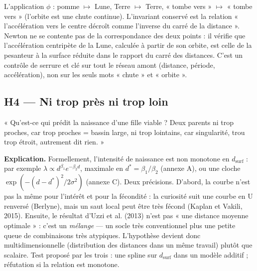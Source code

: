 \documentclass[a4paper,11pt]{article}
\begin{document}
\begin{exemple}
L'application $\phi$ : pomme $\mapsto$ Lune, Terre $\mapsto$ Terre, « tombe vers » $\mapsto$ « tombe vers » (l'orbite est une chute continue). L'invariant conservé est la relation « l'accélération vers le centre décroît comme l'inverse du carré de la distance ». Newton ne se contente pas de la correspondance des deux points : il vérifie que l'accélération centripète de la Lune, calculée à partir de son orbite, est celle de la pesanteur à la surface réduite dans le rapport du carré des distances. C'est un contrôle de serrure et clé sur tout le réseau amont (distance, période, accélération), non sur les seuls mots « chute » et « orbite ».
\end{exemple}

\subsection{H4 — Ni trop près ni trop loin}
\begin{enonce}
« Qu'est-ce qui prédit la naissance d'une fille viable ? Deux parents ni trop proches, car trop proches = bassin large, ni trop lointains, car singularité, trou trop étroit, autrement dit rien. »
\end{enonce}

\textbf{Explication.} Formellement, l'intensité de naissance est non monotone en $d_{\text{surf}}$ : par exemple $\lambda\propto d^{\beta_1}e^{-\beta_2 d}$, maximale en $d^*=\beta_1/\beta_2$ (annexe A), ou une cloche $\exp(-(d-d^*)^2/2\sigma^2)$ (annexe C). Deux précisions. D'abord, la courbe n'est pas la même pour l'intérêt et pour la fécondité : la curiosité suit une courbe en U renversé (Berlyne), mais un saut local peut être très fécond (Kaplan et Vakili, 2015). Ensuite, le résultat d'Uzzi et al. (2013) n'est pas « une distance moyenne optimale » : c'est un \emph{mélange} — un socle très conventionnel plus une petite queue de combinaisons très atypiques. L'hypothèse devient donc multidimensionnelle (distribution des distances dans un même travail) plutôt que scalaire. Test proposé par les trois : une spline sur $d_{\text{surf}}$ dans un modèle additif ; réfutation si la relation est monotone.
\end{document}
